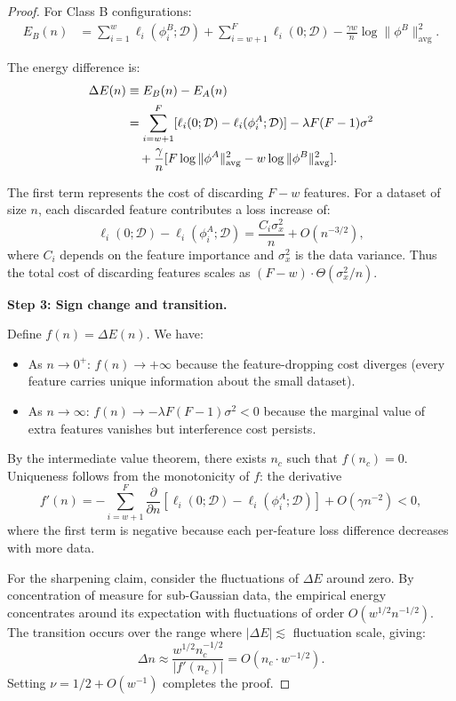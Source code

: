 \documentclass{article}
\newcommand{\nc}{n_c}
\newcommand{\feat}{\phi}
\newcommand{\data}{\mathcal{D}}
\newcommand{\Fnum}{F}
\begin{document}
\begin{proof}
For Class B configurations:
\begin{align}
E_B(n) &= \sum_{i=1}^{w} \ell_i(\feat_i^B; \data) + \sum_{i=w+1}^{\Fnum} \ell_i(0; \data) - \frac{\gamma w}{n} \log \|\feat^B\|^2_{\text{avg}}.
\end{align}

The energy difference is:
\begin{align}
\Delta E(n) &\equiv E_B(n) - E_A(n) \notag \\
&= \sum_{i=w+1}^{\Fnum} [\ell_i(0; \data) - \ell_i(\feat_i^A; \data)] - \lambda \Fnum(\Fnum-1)\sigma^2 \notag \\
&\quad + \frac{\gamma}{n}[\Fnum \log\|\feat^A\|^2_{\text{avg}} - w \log\|\feat^B\|^2_{\text{avg}}].
\end{align}

The first term represents the cost of discarding $\Fnum - w$ features.
For a dataset of size $n$, each discarded feature contributes a loss increase of:
\begin{equation}
\ell_i(0; \data) - \ell_i(\feat_i^A; \data) = \frac{C_i \sigma_x^2}{n} + O(n^{-3/2}),
\end{equation}
where $C_i$ depends on the feature importance and $\sigma_x^2$ is the data variance.
Thus the total cost of discarding features scales as $(\Fnum - w) \cdot \Theta(\sigma_x^2 / n)$.

\textbf{Step 3: Sign change and transition.}

Define $f(n) = \Delta E(n)$.
We have:
\begin{itemize}
    \item As $n \to 0^+$: $f(n) \to +\infty$ because the feature-dropping cost diverges (every feature carries unique information about the small dataset).
    \item As $n \to \infty$: $f(n) \to -\lambda \Fnum(\Fnum-1)\sigma^2 < 0$ because the marginal value of extra features vanishes but interference cost persists.
\end{itemize}

By the intermediate value theorem, there exists $\nc$ such that $f(\nc) = 0$.
Uniqueness follows from the monotonicity of $f$: the derivative
\begin{equation}
f'(n) = -\sum_{i=w+1}^{\Fnum} \frac{\partial}{\partial n}[\ell_i(0;\data) - \ell_i(\feat_i^A;\data)] + O(\gamma n^{-2}) < 0,
\end{equation}
where the first term is negative because each per-feature loss difference decreases with more data.

For the sharpening claim, consider the fluctuations of $\Delta E$ around zero.
By concentration of measure for sub-Gaussian data, the empirical energy concentrates around its expectation with fluctuations of order $O(w^{1/2} n^{-1/2})$.
The transition occurs over the range where $|\Delta E| \lesssim$ fluctuation scale, giving:
\begin{equation}
\Delta n \approx \frac{w^{1/2} n_c^{-1/2}}{|f'(\nc)|} = O(\nc \cdot w^{-1/2}).
\end{equation}
Setting $\nu = 1/2 + O(w^{-1})$ completes the proof.
\end{proof}
\end{document}
